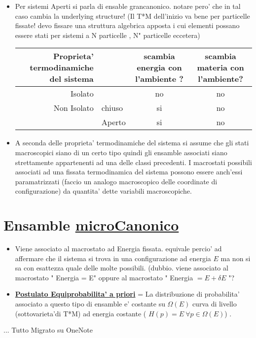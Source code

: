 \documentclass[a4paper,12pt]{scrartcl}    %
\begin{document}
\begin{itemize}
\item Per sistemi Aperti si parla di ensable grancanonico. notare pero' che in tal caso cambia la underlying structure! (Il T*M dell'inizio va bene per particelle fissate! devo fissare una struttura algebrica apposta i cui elementi possano essere stati per sistemi a N particelle , N" particelle eccetera)

\begin{tabular}{|r l || c | c |}
\hline
Proprieta' termodinamiche del sistema& & scambia energia con l'ambiente ? & scambia materia con l'ambiente? \\
\hline
\hline
Isolato & & no & no \\
\hline
Non Isolato & chiuso & si & no \\
 & Aperto & si & no \\
 \hline
\end{tabular}

\item A seconda delle proprieta' termodinamiche del sistema si assume che gli stati macroscopici siano di un certo tipo quindi gli ensamble associati siano strettamente appartenenti ad una delle classi precedenti.
I macrostati possibili associati ad una fissata termodinamica del sistema possono essere anch'essi paramatrizzati (faccio un analogo macroscopico delle coordinate di configurazione) da quantita' dette variabili macroscopiche.





\end{itemize}




\section{Ensamble \href{http://it.wikipedia.org/wiki/Insieme_microcanonico}{microCanonico}}
\begin{itemize}
\item Viene associato al macrostato ad Energia fissata. equivale percio' ad affermare che il sistema si trova in una configurazione ad energia $E$ ma non si sa con esattezza quale delle molte possibili.
(dubbio. viene associato al macrostato " Energia = E" oppure al macrostato " Energia $=E+ \delta E$ "?

\item \href{http://it.wikipedia.org/wiki/Ipotesi_ergodica}{\textbf{Postulato Equiprobabilita' a priori}} = La distribuzione di probabilita' associato a questo tipo di ensamble e' costante su $\Omega(E)$ curva di livello (sottovarieta'di T*M) ad energia costante ( $ H(p) = E \: \forall p \in \Omega(E)$) .




\end{itemize}



...  Tutto Migrato su OneNote
\end{document}
